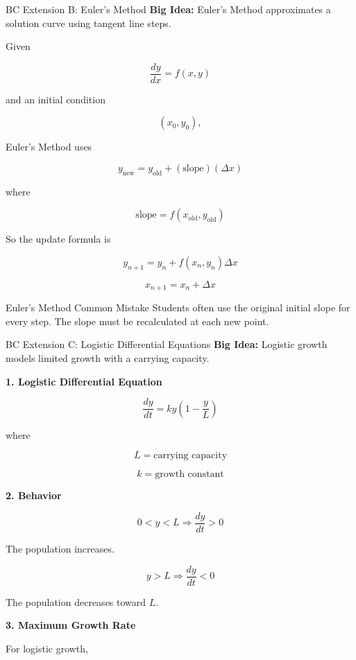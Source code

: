 \documentclass[11pt]{article}
\newcommand{\subtopic}[1]{
\vspace{0.45em}
\textcolor{novelPurpleDark}{\textbf{#1}}
}
\begin{document}
\begin{unitbox}{BC Extension B: Euler's Method}
\textbf{Big Idea:} Euler's Method approximates a solution curve using tangent line steps.
\end{unitbox}

Given

\[
\frac{dy}{dx}=f(x,y)
\]

and an initial condition

\[
(x_0,y_0),
\]

Euler's Method uses

\[
y_{\text{new}}=y_{\text{old}}+(\text{slope})(\Delta x)
\]

where

\[
\text{slope}=f(x_{\text{old}},y_{\text{old}})
\]

So the update formula is

\[
y_{n+1}=y_n+f(x_n,y_n)\Delta x
\]

\[
x_{n+1}=x_n+\Delta x
\]

\begin{warningbox}{Euler's Method Common Mistake}
Students often use the original initial slope for every step.  
The slope must be recalculated at each new point.
\end{warningbox}

\newpage

\begin{unitbox}{BC Extension C: Logistic Differential Equations}
\textbf{Big Idea:} Logistic growth models limited growth with a carrying capacity.
\end{unitbox}

\subtopic{1. Logistic Differential Equation}

\[
\frac{dy}{dt}=ky\left(1-\frac{y}{L}\right)
\]

where

\[
L=\text{carrying capacity}
\]

\[
k=\text{growth constant}
\]

\subtopic{2. Behavior}

\[
0<y<L \Rightarrow \frac{dy}{dt}>0
\]

The population increases.

\[
y>L \Rightarrow \frac{dy}{dt}<0
\]

The population decreases toward \(L\).

\subtopic{3. Maximum Growth Rate}

For logistic growth,
\end{document}
